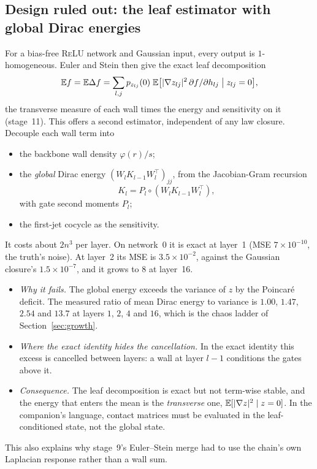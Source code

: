 \subsection{Design ruled out: the leaf estimator with global Dirac energies}
For a bias-free \textsc{ReLU} network and Gaussian input, every output is $1$-homogeneous. Euler and Stein then give the exact leaf
decomposition
\[
\mathbb E f=\mathbb E\Delta f=\sum_{l,j}p_{z_{lj}}(0)\;\mathbb E\big[|\nabla z_{lj}|^2\,\partial f/\partial h_{lj}\;\big|\;z_{lj}=0\big],
\]
the transverse measure of each wall times the energy and sensitivity on it (stage~11). This offers a second estimator, independent of any
law closure. Decouple each wall term into
\begin{itemize}[leftmargin=*]
\item the backbone wall density $\varphi(r)/s$;
\item the \emph{global} Dirac energy $(W_lK_{l-1}W_l^\top)_{jj}$, from the Jacobian-Gram recursion
\[K_l=P_l\circ(W_lK_{l-1}W_l^\top),\]
with gate second moments $P_l$;
\item the first-jet cocycle as the sensitivity.
\end{itemize}
It costs about $2n^3$ per layer. On network~0 it is exact at layer~1 (MSE $7\times10^{-10}$, the truth's noise). At layer~2 its MSE is
$3.5\times10^{-2}$, against the Gaussian closure's $1.5\times10^{-7}$, and it grows to $8$ at layer~16.
\begin{itemize}[leftmargin=*]
\item \emph{Why it fails.} The global energy exceeds the variance of $z$ by the Poincaré deficit. The measured ratio of mean Dirac
energy to variance is $1.00$, $1.47$, $2.54$ and $13.7$ at layers $1$, $2$, $4$ and $16$, which is the chaos ladder of Section~\ref{sec:growth}.
\item \emph{Where the exact identity hides the cancellation.} In the exact identity this excess is cancelled between layers: a wall at
layer $l-1$ conditions the gates above it.
\item \emph{Consequence.} The leaf decomposition is exact but not term-wise stable, and the energy that enters the mean is the
\emph{transverse} one, $\mathbb E[|\nabla z|^2\mid z=0]$. In the companion's language, contact matrices must be evaluated in the leaf-conditioned state, not the
global state.
\end{itemize}
This also explains why stage~9's Euler--Stein merge had to use the chain's own Laplacian response rather than a wall sum.

